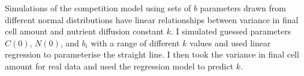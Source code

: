 Simulations of the competition model using sets of \(b\) parameters
drawn from different normal distributions have linear relationships
between variance in final cell amount and nutrient diffusion constant
\(k\). I simulated guessed parameters \(C(0)\), \(N(0)\), and
\(b_{i}\) with a range of different \(k\) values and used linear
regression to parameterise the straight line. I then took the variance
in final cell amount for real data and used the regression model to
predict \(k\).




%


